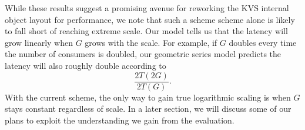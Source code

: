 While these results suggest a promising avenue for reworking the KVS internal
object layout for performance, we note that such a scheme scheme alone
is likely to fall short of reaching extreme scale.
Our model tells us that the latency will grow linearly when $G$ grows
with the scale.   For example, if $G$ doubles every time the number of
consumers is doubled, our geometric series model predicts the latency will
also roughly double according to
\begin{equation}
\frac{2T(2G)}{2T(G)}.
\end{equation}
With the current scheme, the only way to gain true logarithmic
scaling is when $G$ stays constant regardless of scale. 
In a later section, we will discuss some of our plans 
to exploit the understanding we gain from the evaluation. 
